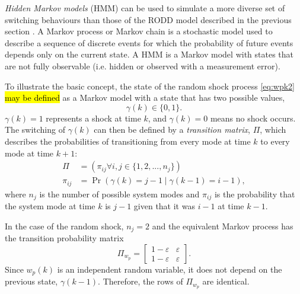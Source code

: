 {\textit{Hidden Markov models} (\gls{HMM}) can be used to simulate a more diverse set of switching behaviours than those of the \gls{RODD} model described in the previous section \citep{wong_realistic_2009}. A Markov process or Markov chain is a stochastic model used to describe a sequence of discrete events for which the probability of future events depends only on the current state. A \gls{HMM} is a Markov model with states that are not fully observable (i.e. hidden or observed with a measurement error).

To illustrate the basic concept, the state of the random shock process \eqref{eq:wpk2} \hl{may be defined} as a Markov model with a state that has two possible values,
\begin{equation} \label{eq:gamma-k}
	\gamma(k) \in \{0,1\}.
\end{equation}
%
$\gamma(k)=1$ represents a shock at time $k$, and $\gamma(k)=0$ means no shock occurs. The switching of $\gamma(k)$ can then be defined by a \textit{transition matrix}, $\Pi$, which describes the probabilities of transitioning from every mode at time $k$ to every mode at time $k+1$:
\begin{equation} \label{eq:Pi}
	\begin{aligned}
	\Pi &= \left(\pi_{ij} \forall i,j\in \{1,2,...,n_j\}\right) \\
	\pi_{ij} &= \Pr\left( \gamma(k)=j-1 \mid \gamma(k-1)=i-1 \right),
	\end{aligned}
\end{equation}
%
%
where $n_j$ is the number of possible system modes and $\pi_{ij}$ is the probability that the system mode at time $k$ is $j-1$ given that it was $i-1$ at time $k-1$.

In the case of the random shock, $n_j=2$ and the equivalent Markov process has the transition probability matrix
%
\begin{equation} \label{eq:Pi-RODD-step}
	\Pi_{w_{p}} = \begin{bmatrix}
	1-\varepsilon & \varepsilon \\
	1-\varepsilon & \varepsilon
	\end{bmatrix}.
\end{equation}
Since $w_{p}(k)$ is an independent random variable, it does not depend on the previous state, $\gamma(k-1)$. Therefore, the rows of $\Pi_{w_{p}}$ are identical.

}
